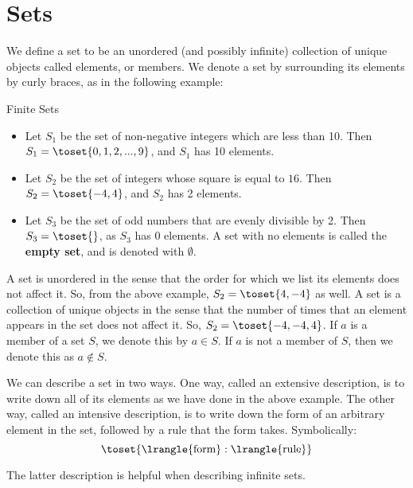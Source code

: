 \section{Sets}
We define a set to be an unordered (and possibly infinite) collection of
unique objects called elements, or members. We denote a set by surrounding
its elements by curly braces, as in the following example:

\begin{expl}{Finite Sets}
  \begin{itemize}
    \item Let $S_1$ be the set of non-negative integers which are less than
    10. Then $S_1 = \toset{0, 1, 2, ..., 9}$, and $S_1$ has 10 elements.

    \item Let $S_2$ be the set of integers whose square is equal to $16$.
    Then $S_2 = \toset{-4, 4}$, and $S_2$ has 2 elements.

    \item Let $S_3$ be the set of odd numbers that are evenly divisible by 2.
    Then $S_3 = \toset{}$, as $S_3$ has 0 elements. A set with no elements is
    called the \textbf{empty set}, and is denoted with $\emptyset$.
  \end{itemize}
\end{expl}

A set is unordered in the sense that the order for which we list its elements
does not affect it. So, from the above example, $S_2 = \toset{4, -4}$ as
well. A set is a collection of unique objects in the sense that the number of
times that an element appears in the set does not affect it. So, $S_2 =
\toset{-4, -4, 4}$. If $a$ is a member of a set $S$, we denote this
by $a \in S$. If $a$ is not a member of $S$, then we denote this as
$a \not \in S$.


We can describe a set in two ways. One way, called an extensive description,
is to write down all of its elements as we have done in the above
example. The other way, called an intensive description, is to write down the
form of an arbitrary element in the set, followed by a rule that the form
takes. Symbolically:
$$ \toset{ \lrangle{\text{form}} : \lrangle{\text{rule}} } $$

The latter description is helpful when describing infinite sets.

